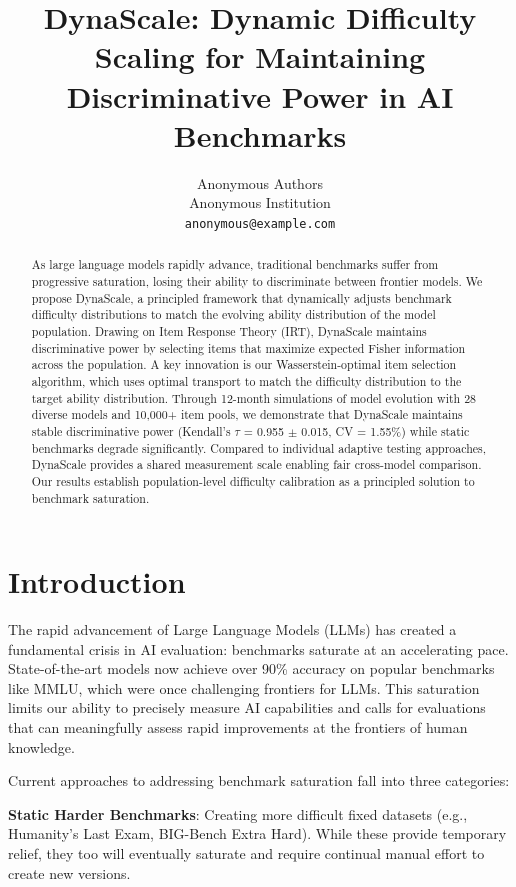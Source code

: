 \documentclass{article}
\title{DynaScale: Dynamic Difficulty Scaling for Maintaining Discriminative Power in AI Benchmarks}
\author{%
  Anonymous Authors\\
  Anonymous Institution\\
  \texttt{anonymous@example.com}
}
\begin{document}
\maketitle

\begin{abstract}
As large language models rapidly advance, traditional benchmarks suffer from progressive saturation, losing their ability to discriminate between frontier models. We propose DynaScale, a principled framework that dynamically adjusts benchmark difficulty distributions to match the evolving ability distribution of the model population. Drawing on Item Response Theory (IRT), DynaScale maintains discriminative power by selecting items that maximize expected Fisher information across the population. A key innovation is our Wasserstein-optimal item selection algorithm, which uses optimal transport to match the difficulty distribution to the target ability distribution. Through 12-month simulations of model evolution with 28 diverse models and 10,000+ item pools, we demonstrate that DynaScale maintains stable discriminative power (Kendall's $\tau$ = 0.955 $\pm$ 0.015, CV = 1.55\%) while static benchmarks degrade significantly. Compared to individual adaptive testing approaches, DynaScale provides a shared measurement scale enabling fair cross-model comparison. Our results establish population-level difficulty calibration as a principled solution to benchmark saturation.
\end{abstract}

\section{Introduction}
\label{sec:intro}

The rapid advancement of Large Language Models (LLMs) has created a fundamental crisis in AI evaluation: benchmarks saturate at an accelerating pace. State-of-the-art models now achieve over 90\% accuracy on popular benchmarks like MMLU, which were once challenging frontiers for LLMs. This saturation limits our ability to precisely measure AI capabilities and calls for evaluations that can meaningfully assess rapid improvements at the frontiers of human knowledge.

Current approaches to addressing benchmark saturation fall into three categories:

\textbf{Static Harder Benchmarks}: Creating more difficult fixed datasets (e.g., Humanity's Last Exam, BIG-Bench Extra Hard). While these provide temporary relief, they too will eventually saturate and require continual manual effort to create new versions.
\end{document}

